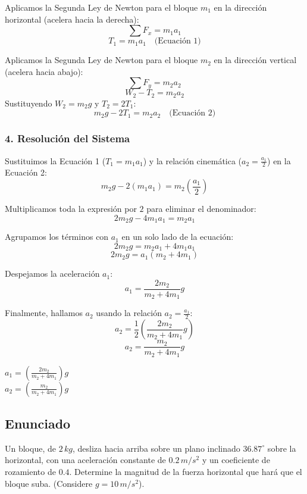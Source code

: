 \documentclass[12pt, a4paper]{article}
\begin{document}
Aplicamos la Segunda Ley de Newton para el bloque $m_1$ en la dirección horizontal (acelera hacia la derecha):
$$ \sum F_x = m_1 a_1 $$
$$ T_1 = m_1 a_1 \quad \text{(Ecuación 1)} $$

Aplicamos la Segunda Ley de Newton para el bloque $m_2$ en la dirección vertical (acelera hacia abajo):
$$ \sum F_y = m_2 a_2 $$
$$ W_2 - T_2 = m_2 a_2 $$
Sustituyendo $W_2 = m_2 g$ y $T_2 = 2 T_1$:
$$ m_2 g - 2 T_1 = m_2 a_2 \quad \text{(Ecuación 2)} $$

\subsubsection*{4. Resolución del Sistema}
Sustituimos la Ecuación 1 ($T_1 = m_1 a_1$) y la relación cinemática ($a_2 = \frac{a_1}{2}$) en la Ecuación 2:
$$ m_2 g - 2 (m_1 a_1) = m_2 \left(\frac{a_1}{2}\right) $$

Multiplicamos toda la expresión por $2$ para eliminar el denominador:
$$ 2 m_2 g - 4 m_1 a_1 = m_2 a_1 $$

Agrupamos los términos con $a_1$ en un solo lado de la ecuación:
$$ 2 m_2 g = m_2 a_1 + 4 m_1 a_1 $$
$$ 2 m_2 g = a_1 (m_2 + 4 m_1) $$

Despejamos la aceleración $a_1$:
$$ a_1 = \frac{2 m_2}{m_2 + 4 m_1} g $$

Finalmente, hallamos $a_2$ usando la relación $a_2 = \frac{a_1}{2}$:
$$ a_2 = \frac{1}{2} \left( \frac{2 m_2}{m_2 + 4 m_1} g \right) $$
$$ a_2 = \frac{m_2}{m_2 + 4 m_1} g $$

\begin{tcolorbox}[colback=green!5!white, colframe=green!50!black, title=Respuesta Final]
\centering
$a_1 = \left( \frac{2 m_2}{m_2 + 4 m_1} \right) g$ \\ \vspace{0.2cm}
$a_2 = \left( \frac{m_2}{m_2 + 4 m_1} \right) g$
\end{tcolorbox}

\newpage

\subsection*{Enunciado}
Un bloque, de $2 \, \si{kg}$, desliza hacia arriba sobre un plano inclinado $36.87^\circ$ sobre la horizontal, con una aceleración constante de $0.2 \, \si{m/s^2}$ y un coeficiente de rozamiento de $0.4$. Determine la magnitud de la fuerza horizontal que hará que el bloque suba. (Considere $g = 10 \, \si{m/s^2}$).
\end{document}
